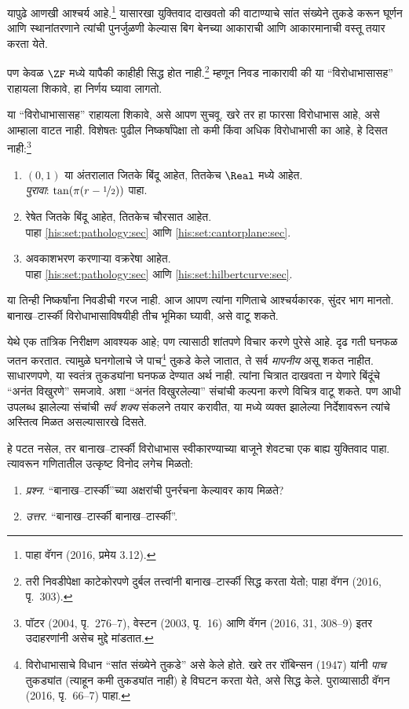यापुढे आणखी आश्चर्य आहे.\footnote{पाहा वॅगन (2016, प्रमेय 3.12).} यासारखा युक्तिवाद दाखवतो की वाटाण्याचे सांत संख्येने तुकडे करून घूर्णन आणि स्थानांतरणाने त्यांची पुनर्जुळणी केल्यास बिग बेनच्या आकाराची आणि आकारमानाची वस्तू तयार करता येते.

पण केवळ $\ZF$ मध्ये यापैकी काहीही सिद्ध होत नाही.\footnote{तरी निवडीपेक्षा काटेकोरपणे दुर्बल तत्त्वांनी बानाख--टार्स्की सिद्ध करता येतो; पाहा वॅगन (2016, पृ.~303).} म्हणून निवड नाकारावी की या “विरोधाभासासह” राहायला शिकावे, हा निर्णय घ्यावा लागतो.

या “विरोधाभासासह” राहायला शिकावे, असे आपण सुचवू. खरे तर हा फारसा विरोधाभास आहे, असे आम्हाला वाटत नाही. विशेषतः पुढील निष्कर्षांपेक्षा तो कमी किंवा अधिक विरोधाभासी का आहे, हे दिसत नाही:\footnote{पॉटर (2004, पृ.~276--7), वेस्टन (2003, पृ.~16) आणि वॅगन (2016, 31, 308--9) इतर उदाहरणांनी असेच मुद्दे मांडतात.}
\begin{enumerate}
	\item $(0,1)$ या अंतरालात जितके बिंदू आहेत, तितकेच $\Real$ मध्ये आहेत.
	\\\emph{पुरावा}: $\tan(\pi(r-\nicefrac{1}{2}))$ पाहा.
	\item रेषेत जितके बिंदू आहेत, तितकेच चौरसात आहेत.
	\\पाहा \ref{his:set:pathology:sec} आणि \ref{his:set:cantorplane:sec}.
	\item अवकाशभरण करणाऱ्या वक्ररेषा आहेत.
	\\पाहा \ref{his:set:pathology:sec} आणि \ref{his:set:hilbertcurve:sec}.
\end{enumerate}
या तिन्ही निष्कर्षांना निवडीची गरज नाही. आज आपण त्यांना गणिताचे आश्चर्यकारक, सुंदर भाग मानतो. बानाख--टार्स्की विरोधाभासाविषयीही तीच भूमिका घ्यावी, असे वाटू शकते.

येथे एक तांत्रिक निरीक्षण आवश्यक आहे; पण त्यासाठी शांतपणे विचार करणे पुरेसे आहे. दृढ गती घनफळ जतन करतात. त्यामुळे घनगोलाचे जे पाच\footnote{विरोधाभासाचे विधान “सांत संख्येने तुकडे” असे केले होते. खरे तर रॉबिन्सन (1947) यांनी \emph{पाच} तुकड्यांत (त्याहून कमी तुकड्यांत नाही) हे विघटन करता येते, असे सिद्ध केले. पुराव्यासाठी वॅगन (2016, पृ.~66--7) पाहा.} तुकडे केले जातात, ते सर्व \emph{मापनीय} असू शकत नाहीत. साधारणपणे, या स्वतंत्र तुकड्यांना घनफळ देण्यात अर्थ नाही. त्यांना चित्रात दाखवता न येणारे बिंदूंचे “अनंत विखुरणे” समजावे. अशा “अनंत विखुरलेल्या” संचांची कल्पना करणे विचित्र वाटू शकते. पण आधी उपलब्ध झालेल्या संचांची \emph{सर्व शक्य} संकलने तयार करावीत, या \stagesacc{} मध्ये व्यक्त झालेल्या निर्देशावरून त्यांचे अस्तित्व मिळत असल्यासारखे दिसते.

हे पटत नसेल, तर बानाख--टार्स्की विरोधाभास स्वीकारण्याच्या बाजूने शेवटचा एक बाह्य युक्तिवाद पाहा. त्यावरून गणितातील उत्कृष्ट विनोद लगेच मिळतो:
\begin{enumerate}
	\item[] \emph{प्रश्न}. “बानाख--टार्स्की”च्या अक्षरांची पुनर्रचना केल्यावर काय मिळते?
	\item[] \emph{उत्तर}. “बानाख--टार्स्की बानाख--टार्स्की”.
\end{enumerate}







